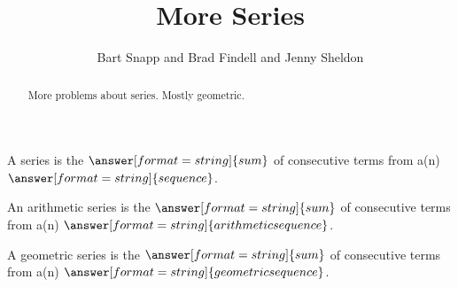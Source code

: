 \documentclass[nooutcomes]{ximera}
\title{More Series}
\author{Bart Snapp and Brad Findell and Jenny Sheldon}
\begin{document}
\begin{abstract}
More problems about series.  Mostly geometric. 
\end{abstract}
\maketitle



\begin{problem}
A series is the $\answer[format=string]{sum}$ of consecutive terms from a(n) $\answer[format=string]{sequence}$.  

An arithmetic series is the $\answer[format=string]{sum}$ of consecutive terms from a(n) $\answer[format=string]{arithmetic sequence}$.  

A geometric series is the $\answer[format=string]{sum}$ of consecutive terms from a(n) $\answer[format=string]{geometric sequence}$.  
\end{problem}
\end{document}
